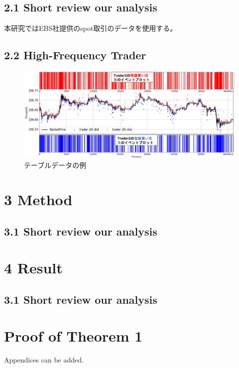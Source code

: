 \documentclass[a4paper,11pt,oneside,openany]{book}
\begin{document}
\section*{2.1 Short review our analysis}
本研究ではEBS社提供のspot取引のデータを使用する。


\section*{2.2 High-Frequency Trader}
\begin{figure}[htb]
  \centering
  \includegraphics[scale=0.7]{./figures/order_sample.pdf}
  \caption{テーブルデータの例}\label{fig:hs}
\end{figure}



\chapter{3 Method}
\section*{3.1 Short review our analysis}


\chapter{4 Result}
\section*{3.1 Short review our analysis}


\appendix
\chapter{Proof of Theorem 1}
Appendices can be added.
\end{document}
